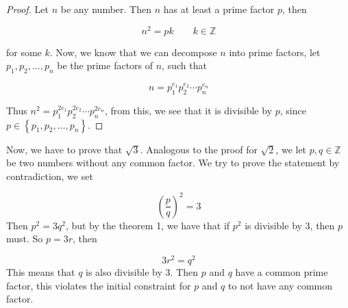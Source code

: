 \documentclass[a4paper,12pt]{article}
\begin{document}
\begin{proof}
  Let $n$ be any number. Then $n$ has at least a prime factor $p$, then

  \[
    n^2=pk\qquad {k\in\mathbb Z}
  \]

  for some $k$. Now, we know that we can decompose $n$ into prime factors, let
  $p_1, p_2, \dots, p_n$ be the prime factors of $n$, such that

  \[
    n=p_1^{e_1}p_2^{e_2}\cdots p_n^{e_n}
  \]

  Thus $n^2=p_1^{2e_1}p_2^{2e_2}\cdots p_n^{2e_n}$, from this, we see that it is
  divisible by $p$, since $p\in\left\{p_1,p_2,\dots,p_n\right\}$.
\end{proof}

Now, we have to prove that $\sqrt{3}$. Analogous to the proof for $\sqrt 2$, we
let $p,q \in \mathbb Z$ be two numbers without any common factor. We try to
prove the statement by contradiction, we set

\[
  {\left(\frac p q\right)}^2 = 3
\]
Then $p^2=3q^2$, but by the theorem 1, we have that if $p^2$ is divisible by 3,
then $p$ must. So $p=3r$, then

\[
  3r^2 = q^2
\]
This means that $q$ is also divisible by 3. Then $p$ and $q$ have a common
prime factor, this violates the initial constraint for $p$ and $q$ to not have
any common factor.
\end{document}
